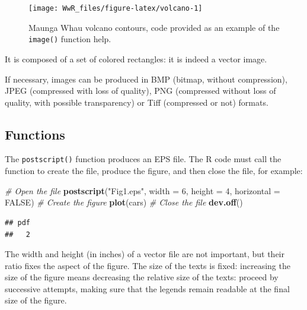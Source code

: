 \documentclass[
  12pt,
  american,
  a4paper,
  extrafontsizes,onecolumn,openright
  ]{memoir}
\newenvironment{Shaded}{\begin{snugshade}}{\end{snugshade}}
\newcommand{\AttributeTok}[1]{\textcolor[rgb]{0.13,0.29,0.53}{#1}}
\newcommand{\CommentTok}[1]{\textcolor[rgb]{0.56,0.35,0.01}{\textit{#1}}}
\newcommand{\ConstantTok}[1]{\textcolor[rgb]{0.56,0.35,0.01}{#1}}
\newcommand{\DecValTok}[1]{\textcolor[rgb]{0.00,0.00,0.81}{#1}}
\newcommand{\FunctionTok}[1]{\textcolor[rgb]{0.13,0.29,0.53}{\textbf{#1}}}
\newcommand{\NormalTok}[1]{#1}
\newcommand{\StringTok}[1]{\textcolor[rgb]{0.31,0.60,0.02}{#1}}
\begin{document}
\begin{figure}

{\centering \texttt{[image: WwR\_files/figure-latex/volcano-1]} 

}

\caption{Maunga Whau volcano contours, code provided as an example of the \texttt{image()} function help.}\label{fig:volcano}
\end{figure}

\normalsize

It is composed of a set of colored rectangles: it is indeed a vector image.

If necessary, images can be produced in BMP (bitmap, without compression), JPEG (compressed with loss of quality), PNG (compressed without loss of quality, with possible transparency) or Tiff (compressed or not) formats.

\subsection{Functions}\label{functions}

The \texttt{postscript()} function produces an EPS file.
The R code must call the function to create the file, produce the figure, and then close the file, for example:

\scriptsize

\begin{Shaded}
\begin{Highlighting}[]
\CommentTok{\# Open the file}
\FunctionTok{postscript}\NormalTok{(}\StringTok{"Fig1.eps"}\NormalTok{, }\AttributeTok{width =} \DecValTok{6}\NormalTok{, }\AttributeTok{height =} \DecValTok{4}\NormalTok{, }\AttributeTok{horizontal =} \ConstantTok{FALSE}\NormalTok{)}
\CommentTok{\# Create the figure}
\FunctionTok{plot}\NormalTok{(cars)}
\CommentTok{\# Close the file}
\FunctionTok{dev.off}\NormalTok{()}
\end{Highlighting}
\end{Shaded}

\begin{verbatim}
## pdf 
##   2
\end{verbatim}

\normalsize

The width and height (in inches) of a vector file are not important, but their ratio fixes the aspect of the figure.
The size of the texts is fixed: increasing the size of the figure means decreasing the relative size of the texts: proceed by successive attempts, making sure that the legends remain readable at the final size of the figure.
\end{document}
